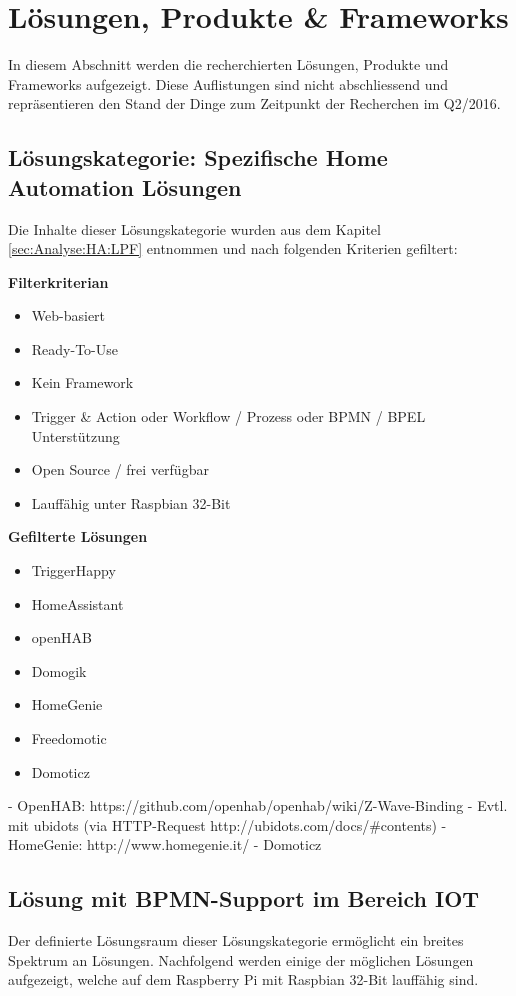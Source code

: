 \section{Lösungen, Produkte \& Frameworks }
In diesem Abschnitt werden die recherchierten Lösungen, Produkte und Frameworks aufgezeigt. Diese Auflistungen sind nicht abschliessend und repräsentieren den Stand der Dinge zum Zeitpunkt der Recherchen im Q2/2016.

\subsection{Lösungskategorie: Spezifische Home Automation Lösungen}
Die Inhalte dieser Lösungskategorie wurden aus dem Kapitel \ref{sec:Analyse:HA:LPF}  entnommen und nach folgenden Kriterien gefiltert:

\textbf{Filterkriterian}
\begin{itemize}
\item Web-basiert
\item Ready-To-Use
\item Kein Framework
\item Trigger \& Action oder Workflow  / Prozess oder BPMN / BPEL Unterstützung
\item Open Source / frei verfügbar
\item Lauffähig unter Raspbian 32-Bit
\end{itemize}

\textbf{Gefilterte Lösungen}
\begin{itemize}
\item TriggerHappy
\item HomeAssistant
\item openHAB
\item Domogik
\item HomeGenie
\item Freedomotic
\item Domoticz
\end{itemize}


- OpenHAB: https://github.com/openhab/openhab/wiki/Z-Wave-Binding
- Evtl. mit ubidots (via HTTP-Request http://ubidots.com/docs/\#contents)
- HomeGenie: http://www.homegenie.it/
- Domoticz

\subsection{Lösung mit BPMN-Support im Bereich IOT}
Der definierte Lösungsraum dieser Lösungskategorie ermöglicht ein breites Spektrum an Lösungen. Nachfolgend werden einige der möglichen Lösungen aufgezeigt, welche auf dem Raspberry Pi mit Raspbian 32-Bit lauffähig sind.

